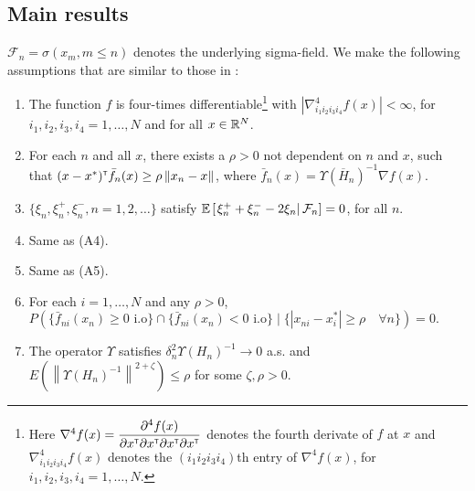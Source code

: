 \documentclass[letterpaper, 10 pt, conference]{ieeeconf}  %
\begin{document}
\subsection{Main results}
\label{sec:2rdsa-results}
 $\mathcal{F}_n = \sigma(x_m,m\le n)$ denotes the underlying sigma-field. 
We make the following assumptions that are similar to those in \cite{spall_adaptive}:
\begin{enumerate}[label=(\textbf{C\arabic*})]
\item  The function
$f$ is four-times differentiable\footnote{Here $\nabla^4 f(x) = \dfrac{\partial^4 f (x)}{\partial x^\mathsf{\scriptscriptstyle T} \partial x^\mathsf{\scriptscriptstyle T} \partial x^\mathsf{\scriptscriptstyle T} \partial x^\mathsf{\scriptscriptstyle T}}$ denotes the fourth derivate of $f$ at $x$ and $\nabla^4_{i_1 i_2 i_3 i_4} f(x)$ denotes the $(i_1 i_2 i_3 i_4)$th entry of $\nabla^4 f(x)$, for $i_1, i_2, i_3,i_4=1,\ldots, N$.} with $\left|\nabla^4_{i_1 i_2 i_3 i_4} f(x) \right| < \infty$, for $i_1, i_2, i_3,i_4=1,\ldots, N$ and for all $x\in \mathbb{R}^N$. 


\item For each $n$ and all $x$, there exists a $\rho>0$ not dependent on $n$ and $x$, such that $(x-x^*)^\mathsf{\scriptscriptstyle T} \bar f_n(x) \ge \rho \left\| x_n - x\right\|$, where $\bar f_n(x) = \Upsilon(\overline H_n)^{-1} \nabla f(x)$.

\item $\{\xi_n, \xi_n^+,\xi_n^-, n=1,2,\ldots\}$ satisfy $\mathbb{E}\left[\left. \xi_n^+ + \xi_n^- - 2 \xi_n \right| \mathcal{F}_n\right] = 0$, for all $n$. 

\item  Same as (A4). %

\item Same as (A5).

\item For each $i=1,\ldots,N$ and any $\rho>0$, 
$P(\{ \bar f_{ni} (x_n) \ge 0 \text{ i.o}\} \cap \{ \bar f_{ni} (x_n) < 0 \text{ i.o}\} \mid \{ |x_{ni} - x^*_i| \ge \rho\quad \forall n\}) =0.$

\item The operator $\Upsilon$ satisfies $\delta_n^2 \Upsilon(H_n)^{-1} \rightarrow 0$ a.s. and  $E(\left\| \Upsilon(H_n)^{-1}\right\|^{2+\zeta}) \le \rho$ for some $\zeta, \rho>0$.


\end{enumerate}
\end{document}
